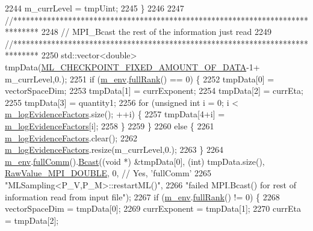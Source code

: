 \begin{DoxyCode}
2244     m\_currLevel = tmpUint;
2245   \}
2246 
2247   \textcolor{comment}{//******************************************************************************}
2248   \textcolor{comment}{// MPI\_Bcast the rest of the information just read}
2249   \textcolor{comment}{//******************************************************************************}
2250   std::vector<double> tmpData(\hyperlink{_m_l_sampling_8h_a6c830698381e4aa1c55b3b418754ae4b}{ML\_CHECKPOINT\_FIXED\_AMOUNT\_OF\_DATA}-1+
      m\_currLevel,0.);
2251   \textcolor{keywordflow}{if} (\hyperlink{class_q_u_e_s_o_1_1_m_l_sampling_a13f1ca4fe9f94822fe572a743eaced1d}{m\_env}.\hyperlink{class_q_u_e_s_o_1_1_base_environment_a84a239e42ae443cf71db6e03e8159620}{fullRank}() == 0) \{
2252     tmpData[0] = vectorSpaceDim;
2253     tmpData[1] = currExponent;
2254     tmpData[2] = currEta;
2255     tmpData[3] = quantity1;
2256     \textcolor{keywordflow}{for} (\textcolor{keywordtype}{unsigned} \textcolor{keywordtype}{int} i = 0; i < \hyperlink{class_q_u_e_s_o_1_1_m_l_sampling_a75f2ceab4a2c6774b3fa07d74221dbf3}{m\_logEvidenceFactors}.size(); ++i) \{
2257       tmpData[4+i] = \hyperlink{class_q_u_e_s_o_1_1_m_l_sampling_a75f2ceab4a2c6774b3fa07d74221dbf3}{m\_logEvidenceFactors}[i];
2258     \}
2259   \}
2260   \textcolor{keywordflow}{else} \{
2261     \hyperlink{class_q_u_e_s_o_1_1_m_l_sampling_a75f2ceab4a2c6774b3fa07d74221dbf3}{m\_logEvidenceFactors}.clear();
2262     \hyperlink{class_q_u_e_s_o_1_1_m_l_sampling_a75f2ceab4a2c6774b3fa07d74221dbf3}{m\_logEvidenceFactors}.resize(m\_currLevel,0.);
2263   \}
2264   \hyperlink{class_q_u_e_s_o_1_1_m_l_sampling_a13f1ca4fe9f94822fe572a743eaced1d}{m\_env}.\hyperlink{class_q_u_e_s_o_1_1_base_environment_a0b0779b41ff304058856e97e1d16b4d4}{fullComm}().\hyperlink{class_q_u_e_s_o_1_1_mpi_comm_abd6af8db8b0c7fd2f5b62e26477a9537}{Bcast}((\textcolor{keywordtype}{void} *) &tmpData[0], (\textcolor{keywordtype}{int}) tmpData.size(), 
      \hyperlink{_mpi_comm_8h_ad0f503bd9fecfe4e570ca3d15aaf2518}{RawValue\_MPI\_DOUBLE}, 0, \textcolor{comment}{// Yes, 'fullComm'}
2265                          \textcolor{stringliteral}{"MLSampling<P\_V,P\_M>::restartML()"},
2266                          \textcolor{stringliteral}{"failed MPI.Bcast() for rest of information read from input file"});
2267   \textcolor{keywordflow}{if} (\hyperlink{class_q_u_e_s_o_1_1_m_l_sampling_a13f1ca4fe9f94822fe572a743eaced1d}{m\_env}.\hyperlink{class_q_u_e_s_o_1_1_base_environment_a84a239e42ae443cf71db6e03e8159620}{fullRank}() != 0) \{
2268     vectorSpaceDim = tmpData[0];
2269     currExponent   = tmpData[1];
2270     currEta        = tmpData[2];

\end{DoxyCode}

